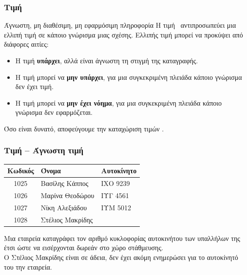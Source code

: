 \begin{frame}
\frametitle{Τιμή \tnull}
\begin{minipage}{\wE}
\vspace*{-0.4cm}
  \begin{block}{Άγνωστη, μη διαθέσιμη, μη εφαρμόσιμη πληροφορία}
    Η τιμή \tnull\ αντιπροσωπεύει μια ελλιπή τιμή σε κάποιο γνώρισμα μιας σχέσης.
    Ελλιπής τιμή μπορεί να προκύψει από διάφορες αιτίες:
    \pause
    \begin{itemize}
      \item Η τιμή {\bf\color{red} υπάρχει}, αλλά είναι άγνωστη τη στιγμή της καταγραφής.
      \item Η τιμή μπορεί να {\bf\color{red} μην υπάρχει}, για μια συγκεκριμένη πλειάδα κάποιο γνώρισμα δεν έχει τιμή.
      \item Η τιμή μπορεί να {\bf\color{red} μην έχει νόημα}, για μια συγκεκριμένη πλειάδα κάποιο γνώρισμα δεν εφαρμόζεται.
    \end{itemize}
  \end{block}
  \pause
  \vspace*{-0.4cm}
  \begin{alertblock}{}%
    Όσο είναι δυνατό, αποφεύγουμε την καταχώριση τιμών \tnull.
  \end{alertblock} 
\end{minipage}  
\end{frame}


\begin{frame}[t, fragile]
\frametitle{Τιμή \tnull -- Άγνωστη τιμή}
\begin{minipage}{\wE}
  \begin{tabular}{ c l l } \hline 
    {\bf Κωδικός} & {\bf Όνομα} & {\bf Αυτοκίνητο} \\ \hline  
    1025 & Βασίλης Κάππος   & ΙΧΟ 9239 \\  
    1026 & Μαρίνα Θεοδώρου  & ΙΥΓ 4561 \\  
    1027 & Νίκη Αλεξιάδου   & ΙΥΜ 5012 \\   
    1028 & Στέλιος Μακρίδης &  \\ \hline 
  \end{tabular}
  \bigskip
  \par Μια εταιρεία καταγράφει τον αριθμό κυκλοφορίας αυτοκινήτου των υπαλλήλων της έτσι ώστε
       να εισέρχονται δωρεάν στο χώρο στάθμευσης. \\ 
       Ο Στέλιος Μακρίδης είναι σε άδεια, δεν έχει ακόμη ενημερώσει για το αυτοκίνητό του την εταιρεία.
\end{minipage}  
\end{frame}


